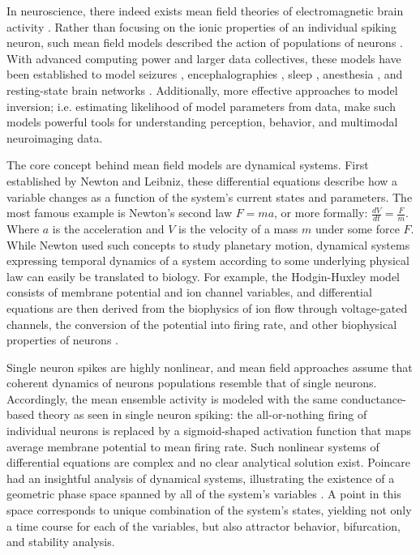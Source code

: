 In neuroscience, there indeed exists mean field theories of electromagnetic brain activity \cite{PhysRevLett.77.960}. Rather than focusing on the ionic properties of an individual spiking neuron, such mean field models described the action of populations of neurons \cite{freeman_mass_1975}. With advanced computing power and larger data collectives, these models have been established to model seizures \cite{breakspear2006unifying}, encephalographies \cite{bojak2015emergence}, sleep \cite{phillips2007quantitative}, anesthesia \cite{bojak2005modeling}, and resting-state brain networks \cite{Honey2007,Deco2009}. Additionally, more effective approaches to model inversion; i.e. estimating likelihood of model parameters from data, make such models powerful tools for understanding perception, behavior, and multimodal neuroimaging data. 

The core concept behind mean field models are dynamical systems. First established by Newton and Leibniz, these differential equations describe how a variable changes as a function of the system's current states and parameters. The most famous example is Newton's second law $F = ma$, or more formally: $\frac{dV}{dt} = \frac{F}{m}$. Where $a$ is the acceleration and $V$ is the velocity of a mass $m$ under some force $F$. While Newton used such concepts to study planetary motion, dynamical systems expressing temporal dynamics of a system according to some underlying physical law can easily be translated to biology. For example, the Hodgin-Huxley model consists of membrane potential and ion channel variables, and differential equations are then derived from the biophysics of ion flow through voltage-gated channels, the conversion of the potential into firing rate, and other biophysical properties of neurons \cite{hodgkin_quantitative_1952,Wilson1972}. 

Single neuron spikes are highly nonlinear, and mean field approaches assume that coherent dynamics of neurons populations resemble that of single neurons. Accordingly, the mean ensemble activity is modeled with the same conductance-based theory as seen in single neuron spiking: the all-or-nothing firing of individual neurons is replaced by a sigmoid-shaped activation function that maps average membrane potential to mean firing rate. Such nonlinear systems of differential equations are complex and no clear analytical solution exist. Poincare had an insightful analysis of dynamical systems, illustrating the existence of a geometric phase space spanned by all of the system's variables \cite{poincare1899methodes}. A point in this space corresponds to unique combination of the system's states, yielding not only a time course for each of the variables, but also attractor behavior, bifurcation, and stability analysis. 

